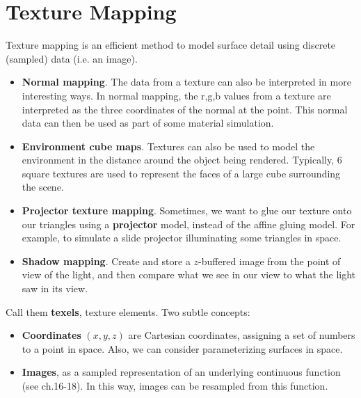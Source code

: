 \documentclass[letterpaper,12pt]{article}
\begin{document}
\section*{Texture Mapping}
Texture mapping is an efficient method to model surface detail using discrete (sampled) data (i.e. an image).

\begin{itemize}
    \item \textbf{Normal mapping}. The data from a texture can also be interpreted in more interesting ways. In normal mapping, the r,g,b values from a texture are interpreted as the three coordinates of the normal at the point. This normal data can then be used as part of some material simulation.
    \item \textbf{Environment cube maps}. Textures can also be used to model the environment in the distance around the object being rendered. Typically, 6 square textures are used to represent the faces of a large cube surrounding the scene.
    \item \textbf{Projector texture mapping}. Sometimes, we want to glue our texture onto our triangles using a \textbf{projector} model, instead of the affine gluing model. For example, to simulate a slide projector illuminating some triangles in space.
    \item \textbf{Shadow mapping}. Create and store a $z$-buffered image from the point of view of the light, and then compare what we see in our view to what the light saw in its view.
\end{itemize}

Call them \textbf{texels}, texture elements. Two subtle concepts:
\begin{itemize}
    \item \textbf{Coordinates} $(x,y,z)$ are Cartesian coordinates, assigning a set of numbers to a point in space. Also, we can consider parameterizing surfaces in space.
    \item \textbf{Images}, as a sampled representation of an underlying continuous function (see ch.16-18). In this way, images can be resampled from this function.
\end{itemize}
\end{document}
